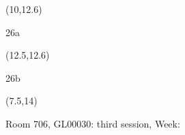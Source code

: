 \documentclass[a4paper]{article}
\newcommand{\myseat}[4]{%
\vspace{-0.1cm}
\parbox[t][2.2cm][t]{3.5cm}{
\small #1 %
\begin{description}
\vspace{-0.1cm}
\item [ID:] #2
\vspace{-0.1cm}
\item [Team:] #3 \normalsize
\vspace{-0.1cm}
\item \normalsize #4
\vspace{-0.1cm}
\end{description}
}
}
\begin{document}
\begin{CJK}{UTF8}{cyberbit}
\begin{textblock}{2.5}(10,12.6)
\textblockcolor{}
\myseat{26a}{}{}{}
\end{textblock}

\begin{textblock}{2.5}(12.5,12.6)
\textblockcolor{}
\myseat{26b}{}{}{}
\end{textblock}

\begin{textblock}{7.5}(7.5,14)
\textblockcolor{}
\parbox[t][2.2cm][t]{9.5cm}{%
\large Room 706, GL00030: third session, Week: 
}
\end{textblock}

\end{CJK}
\end{document}
